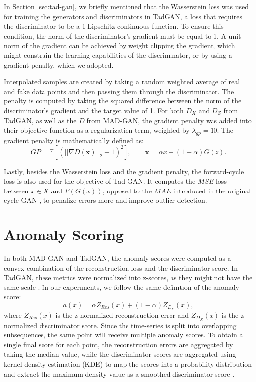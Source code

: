 In Section \ref{sec:tad-gan}, we briefly mentioned that the Wasserstein loss was used for training the generators and discriminators in TadGAN, a loss that requires the discriminator to be a 1-Lipschitz continuous function. To ensure this condition, the norm of the discriminator's gradient must be equal to 1. A unit norm of the gradient can be achieved by weight clipping the gradient, which might constrain the learning capabilities of the discriminator, or by using a gradient penalty, which we adopted. 

Interpolated samples are created by taking a random weighted average of real and fake data points and then passing them through the discriminator. The penalty is computed by taking the squared difference between the norm of the discriminator's gradient and the target value of 1. For both $D_X$ and $D_Z$ from TadGAN, as well as the $D$ from MAD-GAN, the gradient penalty was added into their objective function as a regularization term, weighted by $\lambda_{gp} = 10$. The gradient penalty is mathematically defined as:
$$
GP = \mathbb{E} \left[ \left( ||\nabla D(\textbf{x})||_2 - 1\right)^2 \right], \qquad \textbf{x} = \alpha x + (1-\alpha) G(z).
$$

Lastly, besides the Wasserstein loss and the gradient penalty, the forward-cycle loss is also used for the objective of Tad-GAN. It computes the $MSE$ loss between $x \in X$ and $F(G(x))$, opposed to the $MAE$ introduced in the original cycle-GAN \cite{zhu2017cyclegan}, to penalize errors more and improve outlier detection.



\section{Anomaly Scoring}
\label{sec:04-anomaly-scoring}

In both MAD-GAN and TadGAN, the anomaly scores were computed as a convex combination of the reconstruction loss and the discriminator score. In TadGAN, these metrics were normalized into z-scores, as they might not have the same scale \cite{geiger2020tadgan}. In our experiments, we follow the same definition of the anomaly score: 
$$a(x) = \alpha Z_{Res}(x) + (1-\alpha) Z_{D_X}(x),$$
where $Z_{Res}(x)$ is the z-normalized reconstruction error and $Z_{D_X}(x)$ is the z-normalized discriminator score. Since the time-series is split into overlapping subsequences, the same point will receive multiple anomaly scores. To obtain a single final score for each point, the reconstruction errors are aggregated by taking the median value, while the discriminator scores are aggregated using kernel density estimation (KDE) to map the scores into a probability distribution and extract the maximum density value as a smoothed discriminator score \cite{geiger2020tadgan}.

